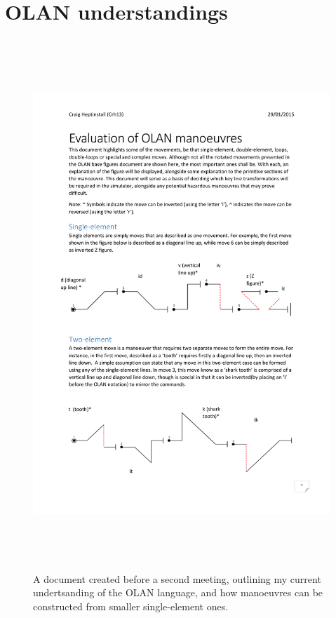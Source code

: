\section{OLAN understandings}
\label{app:olan}
\begin{figure}[h!]
	\centering
	\caption{A document created before a second meeting, outlining my current undertsanding of the OLAN language, and how manoeuvres can be constructed from smaller single-element ones.}
	\includegraphics[width=16cm,height=20cm,page=1]{images/eval.pdf}
\end{figure}
